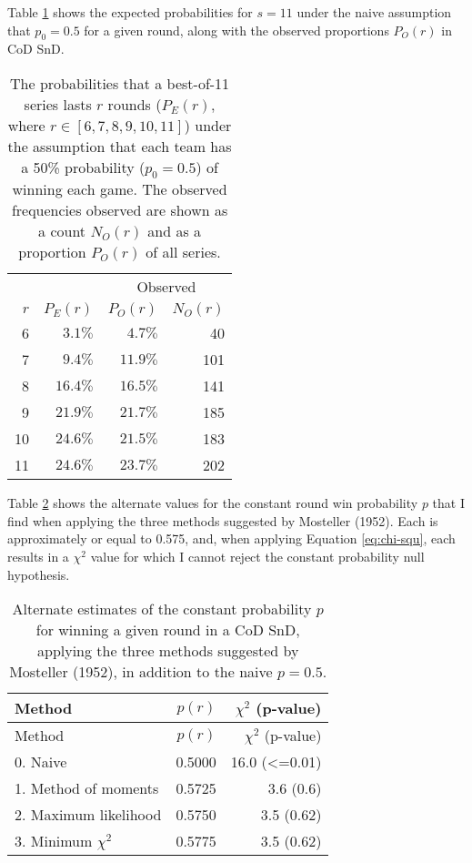 \documentclass{article}
\begin{document}
Table \ref{tbl:cod-prob-series-lasting-r-rounds} shows the expected
probabilities for \(s = 11\) under the naive assumption that
\(p_0 = 0.5\) for a given round, along with the observed proportions
\(P_O(r)\) in CoD SnD.

\begin{longtable}{rrrr}
\caption{The probabilities that a best-of-11 series lasts $r$ rounds ($P_E(r)$, where $r \in [6, 7, 8, 9, 10, 11]$) under the assumption that each team has a 50\% probability ($p_0 = 0.5$) of winning each game. The observed frequencies observed are shown as a count $N_O(r)$ and as a proportion $P_O(r)$ of all series.}\label{tbl:cod-prob-series-lasting-r-rounds} \\
\toprule
&  & \multicolumn{2}{c}{Observed} \\ 
\cmidrule(lr){3-4}
$r$ & $P_E(r)$ & $P_O(r)$ & $N_O(r)$ \\ 
\midrule
6 & $3.1\%$ & $4.7\%$ & 40 \\ 
7 & $9.4\%$ & $11.9\%$ & 101 \\ 
8 & $16.4\%$ & $16.5\%$ & 141 \\ 
9 & $21.9\%$ & $21.7\%$ & 185 \\ 
10 & $24.6\%$ & $21.5\%$ & 183 \\ 
11 & $24.6\%$ & $23.7\%$ & 202 \\ 
\bottomrule
\end{longtable}

Table \ref{tbl:mosteller-methods-results} shows the alternate values for
the constant round win probability \(p\) that I find when applying the
three methods suggested by Mosteller (1952). Each is approximately or
equal to 0.575, and, when applying Equation \ref{eq:chi-squ}, each
results in a \(\chi^2\) value for which I cannot reject the constant
probability null hypothesis.

\begin{longtable}[]{@{}lrr@{}}
\caption{Alternate estimates of the constant probability \(p\) for winning a given round in a CoD SnD, applying the three methods suggested by Mosteller (1952), in addition to the naive \(p = 0.5\).}\label{tbl:mosteller-methods-results} \\
\toprule()
Method & \(p(r)\) & \(\chi^2\) (p-value) \\
\midrule()
\endfirsthead
\toprule()
Method & \(p(r)\) & \(\chi^2\) (p-value) \\
\midrule()
\endhead
0. Naive & 0.5000 & 16.0 (\textless=0.01) \\
1. Method of moments & 0.5725 & 3.6 (0.6) \\
2. Maximum likelihood & 0.5750 & 3.5 (0.62) \\
3. Minimum \(\chi^2\) & 0.5775 & 3.5 (0.62) \\
\bottomrule()
\end{longtable}
\end{document}
